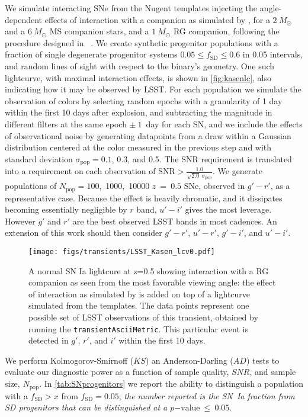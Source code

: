 We simulate interacting SNe from the Nugent templates \citep{Nugent02}
injecting the angle-dependent effects of interaction with a companion
as simulated by \citep{Kasen10}, for a $2~M_\odot$ and a $6~M_\odot$
MS companion stars, and a $1~M_\odot$ RG companion, following the
procedure designed in ~\citep{Bianco11}. We create synthetic progenitor
populations with a fraction of single degenerate progenitor systems
$0.05 \leq f_\mathrm{SD} \leq 0.6 $ in 0.05 intervals, and random lines of
sight with respect to the binary's geometry. One such lightcurve, with
maximal interaction effects, is shown in \autoref{fig:kasenlc}, also
indicating how it may be observed by LSST. For each population we
simulate the observation of colors by selecting random epochs with a
granularity of 1 day within the first 10 days after explosion, and
subtracting the magnitude in different filters at the same epoch
$\pm~1$~day for each SN, and we include the effects of observational
noise by generating datapoints from a draw within a Gaussian
distribution centered at the color measured in the previous step and
with standard deviation $\sigma_\mathrm{pop} = 0.1$, 0.3, and 0.5.
The SNR requirement is
translated into a requirement on each
observation of $\mathrm{SNR} >
\frac{1.0}{\sqrt{2.0}~\sigma_\mathrm{pop}}$.
We generate populations of $N_\mathrm{pop}=100$,~1000,~10000 $z~=~0.5$ SNe,
observed in $g'-r'$, as a representative case. Because the effect is
heavily chromatic, and it dissipates becoming essentially negligible
by $r$ band, $u'-i'$ gives the most leverage. However $g'$ and $r'$
are the best observed LSST bands in most cadences. An extension of
this work should then consider $g'-r'$, $u'-r'$, $g'-i'$, and $u'-i'$.

\begin{figure}[hbt]
\centerline{
\texttt{[image: figs/transients/LSST\_Kasen\_lcv0.pdf]}
}
\caption{ A normal SN Ia lightcure at z=0.5 showing interaction with a
  RG companion as seen from the most favorable viewing angle: the
  effect of interaction as simulated by \citet{Kasen10} is added on
  top of a lightcurve simulated from the \citealt{Nugent02}
  templates. The data points represent one possible set of LSST
  observations of this transient, obtained by running the
  \texttt{transientAsciiMetric}.  This particular event is detected in
  $g'$, $r'$, and $i'$ within the first 10 days.}
\label{fig:kasenlc}
\end{figure}

We perform Kolmogorov-Smirnoff ($KS$) an Anderson-Darling ($AD$) tests
to evaluate our diagnostic power as a function of sample quality,
$SNR$, and sample size, $N_\mathrm{pop}$.  In
\autoref{tab:SNprogenitors} we report the ability to distinguish a
population with a $f_\mathrm{SD} > x$ from $f_\mathrm{SD}=0.05$; \emph{the
number reported is the SN~Ia fraction from SD progenitors that can be
distinguished at a $p\mathrm{-value}~\leq ~0.05$}.

